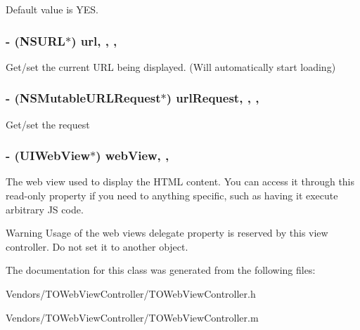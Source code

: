 Default value is Y\+E\+S. \hypertarget{interface_t_o_web_view_controller_a32d5535e58748da901994b6c7bc12d53}{}
\subsubsection[{url}]{\setlength{\rightskip}{0pt plus 5cm}-\/ (N\+S\+U\+R\+L$\ast$) url\hspace{0.3cm}{\ttfamily [read]}, {\ttfamily [write]}, {\ttfamily [nonatomic]}, {\ttfamily [strong]}}\label{interface_t_o_web_view_controller_a32d5535e58748da901994b6c7bc12d53}
Get/set the current U\+R\+L being displayed. (Will automatically start loading) \hypertarget{interface_t_o_web_view_controller_a8b671f36f5e0ba80a1a5a449f3d82b80}{}
\subsubsection[{url\+Request}]{\setlength{\rightskip}{0pt plus 5cm}-\/ (N\+S\+Mutable\+U\+R\+L\+Request$\ast$) url\+Request\hspace{0.3cm}{\ttfamily [read]}, {\ttfamily [write]}, {\ttfamily [nonatomic]}, {\ttfamily [strong]}}\label{interface_t_o_web_view_controller_a8b671f36f5e0ba80a1a5a449f3d82b80}
Get/set the request \hypertarget{interface_t_o_web_view_controller_acc4a012c799ce2ab0834426a68bba120}{}
\subsubsection[{web\+View}]{\setlength{\rightskip}{0pt plus 5cm}-\/ (U\+I\+Web\+View$\ast$) web\+View\hspace{0.3cm}{\ttfamily [read]}, {\ttfamily [nonatomic]}, {\ttfamily [assign]}}\label{interface_t_o_web_view_controller_acc4a012c799ce2ab0834426a68bba120}
The web view used to display the H\+T\+M\+L content. You can access it through this read-\/only property if you need to anything specific, such as having it execute arbitrary J\+S code.

\begin{DoxyWarning}{Warning}
Usage of the web view\textquotesingle{}s delegate property is reserved by this view controller. Do not set it to another object. 
\end{DoxyWarning}


The documentation for this class was generated from the following files\+:\begin{DoxyCompactItemize}
\item 
Vendors/\+T\+O\+Web\+View\+Controller/T\+O\+Web\+View\+Controller.\+h\item 
Vendors/\+T\+O\+Web\+View\+Controller/T\+O\+Web\+View\+Controller.\+m\end{DoxyCompactItemize}
